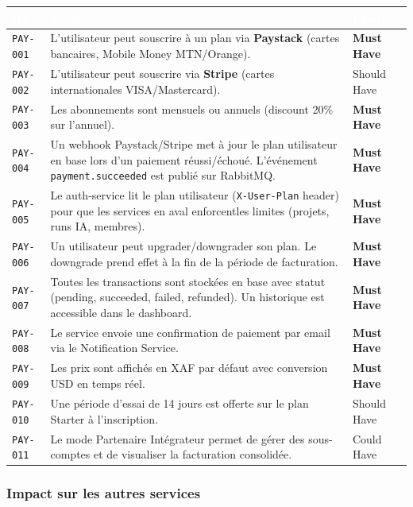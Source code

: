 \documentclass[12pt,a4paper]{article}
\newcommand{\req}[1]{\texttt{\textcolor{daedalusblue}{#1}}}
\newcommand{\musthave}{\cellcolor{musthave}\textbf{Must Have}}
\newcommand{\shouldhave}{\cellcolor{shouldhave}Should Have}
\newcommand{\couldhave}{\cellcolor{couldhave}Could Have}
\begin{document}
\begin{tabularx}{\textwidth}{|l|X|l|}
\hline
\rowcolor{tablehead}\textcolor{white}{\textbf{ID}} & \textcolor{white}{\textbf{Exigence}} & \textcolor{white}{\textbf{Priorité}} \\
\hline
\req{PAY-001} & L'utilisateur peut souscrire à un plan via \textbf{Paystack} (cartes bancaires, Mobile Money MTN/Orange). & \musthave \\
\hline
\req{PAY-002} & L'utilisateur peut souscrire via \textbf{Stripe} (cartes internationales VISA/Mastercard). & \shouldhave \\
\hline
\req{PAY-003} & Les abonnements sont mensuels ou annuels (discount 20\% sur l'annuel). & \musthave \\
\hline
\req{PAY-004} & Un webhook Paystack/Stripe met à jour le plan utilisateur en base lors d'un paiement réussi/échoué. L'événement \texttt{payment.succeeded} est publié sur RabbitMQ. & \musthave \\
\hline
\req{PAY-005} & Le auth-service lit le plan utilisateur (\texttt{X-User-Plan} header) pour que les services en aval enforcentles limites (projets, runs IA, membres). & \musthave \\
\hline
\req{PAY-006} & Un utilisateur peut upgrader/downgrader son plan. Le downgrade prend effet à la fin de la période de facturation. & \musthave \\
\hline
\req{PAY-007} & Toutes les transactions sont stockées en base avec statut (pending, succeeded, failed, refunded). Un historique est accessible dans le dashboard. & \musthave \\
\hline
\req{PAY-008} & Le service envoie une confirmation de paiement par email via le Notification Service. & \musthave \\
\hline
\req{PAY-009} & Les prix sont affichés en XAF par défaut avec conversion USD en temps réel. & \musthave \\
\hline
\req{PAY-010} & Une période d'essai de 14 jours est offerte sur le plan Starter à l'inscription. & \shouldhave \\
\hline
\req{PAY-011} & Le mode Partenaire Intégrateur permet de gérer des sous-comptes et de visualiser la facturation consolidée. & \couldhave \\
\hline
\end{tabularx}

\subsubsection{Impact sur les autres services}
\end{document}
